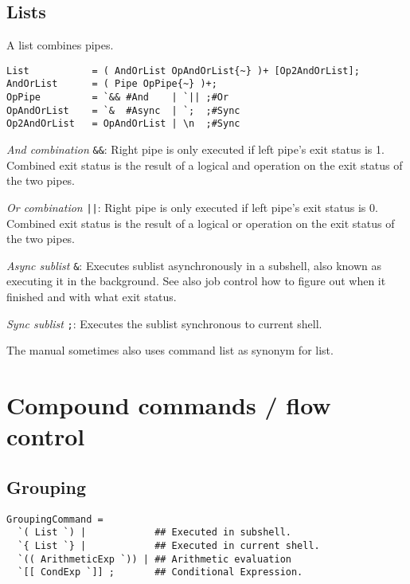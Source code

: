 \documentclass{article}
\begin{document}

\subsection{Lists}

A list combines pipes.

\begin{verbatim}
List           = ( AndOrList OpAndOrList{~} )+ [Op2AndOrList]; 
AndOrList      = ( Pipe OpPipe{~} )+; 
OpPipe         = `&& #And    | `|| ;#Or
OpAndOrList    = `&  #Async  | `;  ;#Sync
Op2AndOrList   = OpAndOrList | \n  ;#Sync    
\end{verbatim}

\emph{And combination} \verb|&&|: Right pipe is only executed if left
pipe's exit status is 1. Combined exit status is the result of a logical
and operation on the exit status of the two pipes.

\emph{Or combination} \verb#||#: Right pipe is only executed if left
pipe's exit status is 0. Combined exit status is the result of a logical
or operation on the exit status of the two pipes.

\emph{Async sublist} \verb|&|: Executes sublist asynchronously in a
subshell, also known as executing it in the background. See also job
control how to figure out when it finished and with what exit status.

\emph{Sync sublist} \verb|;|: Executes the sublist synchronous to current shell.

The manual sometimes also uses command list as synonym for list.


\section{Compound commands / flow control}

\subsection{Grouping }

\begin{verbatim}
GroupingCommand =        
  `( List `) |            ## Executed in subshell.  
  `{ List `} |            ## Executed in current shell. 
  `(( ArithmeticExp `)) | ## Arithmetic evaluation 
  `[[ CondExp `]] ;	      ## Conditional Expression. 
\end{verbatim}
\end{document}
